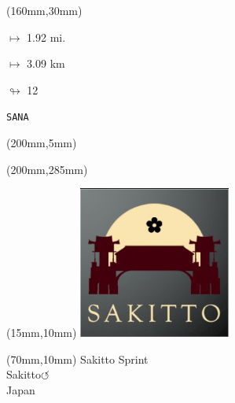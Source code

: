 \begin{textblock*}{40mm}(160mm,30mm)%
\Large
\par$\mapsto$ 1.92 mi.
\par$\mapsto$ 3.09 km
\par$\looparrowright$ 12
\par\hfill\tiny\tt SANA\\
\end{textblock*}
\begin{textblock*}{20mm}(200mm,5mm)%
\fbox{\thepage}
\label{SANA}
\end{textblock*}
\begin{textblock*}{20mm}(200mm,285mm)%
\fbox{\thepage}
\end{textblock*}

\null\newpage
\begin{textblock*}{50mm}(15mm,10mm)%
\includegraphics[width=50mm]{LG/2015-05-20_00093.png}
\end{textblock*}
\begin{textblock*}{130mm}(70mm,10mm)%
{\fontsize{20}{20}\selectfont Sakitto Sprint\\}
{\fontsize{16}{16}\selectfont Sakitto\hfill \huge$\circlearrowleft$\\}
{\fontsize{12}{12}\selectfont Japan\\}
\end{textblock*}
